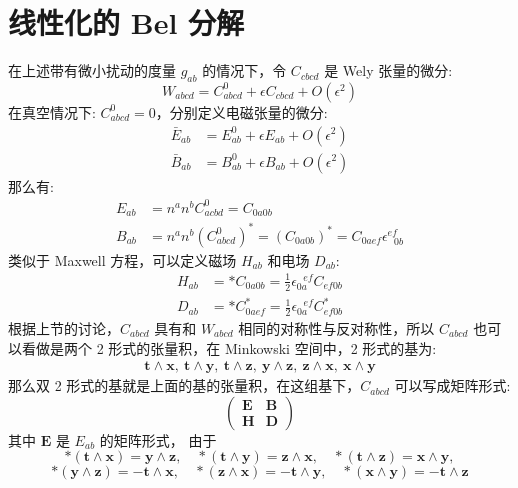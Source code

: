 \documentclass[lang=cn,a4paper,newtx]{elegantpaper}
\begin{document}
\section{线性化的 Bel 分解}
在上述带有微小扰动的度量 $g_{ab}$ 的情况下，令 $C_{cbcd}$ 是 Wely 张量的微分:
$$
W_{abcd} = C_{abcd}^0 + \epsilon C_{cbcd} + O(\epsilon^2)
$$
在真空情况下: $C_{abcd}^0 = 0$，分别定义电磁张量的微分:
$$
\begin{aligned}
    \bar{E}_{ab} & = E_{ab}^0 + \epsilon E_{ab} + O(\epsilon^2)\\
    \bar{B}_{ab} & = B_{ab}^0 + \epsilon B_{ab} + O(\epsilon^2)
\end{aligned}
$$
那么有:
$$
\begin{aligned}
    E_{ab} & = n^an^bC_{acbd}^0 = C_{0a0b}\\
    B_{ab} & = n^an^b(C_{abcd}^0)^* = (C_{0a0b})^* =
    C_{0aef}\epsilon^{ef}_{\ \ \ 0b}
\end{aligned}
$$
类似于 Maxwell 方程，可以定义磁场 $H_{ab}$ 和电场 $D_{ab}$:
$$
\begin{aligned}
    H_{ab} & = *C_{0a0b} = \frac{1}{2}\epsilon_{0a}^{\ \ \
    ef}C_{ef0b}\\
    D_{ab} & = *C_{0aef}^* = \frac{1}{2}\epsilon_{0a}^{\ \ \
    ef}C_{ef0b}^*
\end{aligned}
$$
根据上节的讨论，$C_{abcd}$ 具有和 $W_{abcd}$ 相同的对称性与反对称性，所以
$C_{abcd}$ 也可以看做是两个 2 形式的张量积，在 Minkowski 空间中，2 形式的基为:
\begin{align}
\label{2formbasis}
\boldsymbol{t}\wedge\boldsymbol{x},\  \boldsymbol{t}\wedge\boldsymbol{y},\ 
\boldsymbol{t}\wedge\boldsymbol{z},\  \boldsymbol{y}\wedge\boldsymbol{z},\ 
\boldsymbol{z}\wedge\boldsymbol{x},\  \boldsymbol{x}\wedge\boldsymbol{y}
\end{align}
那么双 2 形式的基就是上面的基的张量积，在这组基下，$C_{abcd}$ 可以写成矩阵形式:
$$
\begin{pmatrix}
    \boldsymbol{E} & \boldsymbol{B}\\
    \boldsymbol{H} & \boldsymbol{D}
\end{pmatrix}
$$
其中 $\boldsymbol{E}$ 是 $E_{ab}$ 的矩阵形式，
由于 
$$
*(\boldsymbol{t}\wedge\boldsymbol{x}) = \boldsymbol{y}\wedge\boldsymbol{z},
\quad 
*(\boldsymbol{t}\wedge\boldsymbol{y}) = \boldsymbol{z}\wedge\boldsymbol{x},
\quad 
*(\boldsymbol{t}\wedge\boldsymbol{z}) = \boldsymbol{x}\wedge\boldsymbol{y},
$$
$$
*(\boldsymbol{y}\wedge\boldsymbol{z}) = -\boldsymbol{t}\wedge\boldsymbol{x},
\quad 
*(\boldsymbol{z}\wedge\boldsymbol{x}) = -\boldsymbol{t}\wedge\boldsymbol{y},
\quad 
*(\boldsymbol{x}\wedge\boldsymbol{y}) = -\boldsymbol{t}\wedge\boldsymbol{z}
$$
\end{document}
